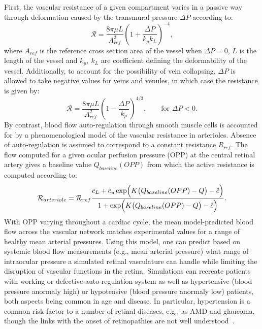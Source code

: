 \documentclass[12pt,a4paper]{journal}
\begin{document}
First, the vascular resistance of a given compartment varies in a passive way through deformation caused by the transmural pressure $\Delta P$ according to:
\begin{equation*}
  \label{eq:PassiveVariableResistance}
  \mathcal{R} = \frac{8\pi\mu L}{A^2_{ref}}\left(1+\frac{\Delta P}{k_pk_L}\right)^{-4},
\end{equation*}
where $A_{ref}$ is the reference cross section area of the vessel when $\Delta P = 0$, $L$ is the length of the vessel and $k_p,~k_L$ are coefficient defining the deformability of the vessel.
Additionally, to account for the possibility of vein collapsing, $\Delta P$ is allowed to take negative values for veins and venules, in which case the resistance is given by:
\begin{equation*}
  \label{eq:PassiveVariableResistanceCollapse}
  \mathcal{R} = \frac{8\pi\mu L}{A^2_{ref}}\left(1-\frac{\Delta P}{k_p}\right)^{4/3},\qquad \text{for } \Delta P<0.
\end{equation*}
By contrast, blood flow auto-regulation through smooth muscle cells is accounted for by a phenomenological model of the vascular resistance in arterioles.
Absence of auto-regulation is assumed to correspond to a constant resistance $R_{ref}$.
The flow computed for a given ocular perfusion pressure (OPP) at the central retinal artery gives a baseline value $Q_{baseline}(OPP)$ from which the active resistance is computed according to:
\begin{equation*}
  \label{eq:ActiveResistancePhenomenological}
  \mathcal{R}_{arteriole} = \mathcal{R}_{ref}\frac{c_L + c_u\exp\Bigl(K\bigl(Q_{baseline}(OPP)- Q\bigr)-\hat c\Bigr)}{1 + \exp\Bigl(K\bigl(Q_{baseline}(OPP)- Q\bigr)-\hat c\Bigr)}.
\end{equation*}
With OPP varying throughout a cardiac cycle, the mean model-predicted blood flow across the vascular network matches experimental values for a range of healthy mean arterial pressures.
Using this model, one can predict based on systemic blood flow measurements (e.g., mean arterial pressure) what range of intraocular pressure a simulated retinal vasculature can handle while limiting the disruption of vascular functions in the retina.
Simulations can recreate patients with working or defective auto-regulation system as well as hypertensive (blood pressure anormaly high) or hypotensive (blood pressure anormaly low) patients, both aspects being common in age and disease.
In particular, hypertension is a common risk factor to a number of retinal diseases, e.g., as AMD and glaucoma, though the links with the onset of retinopathies are not well understood~\cite{Klein_2004, Leeman_2019}.
\end{document}
